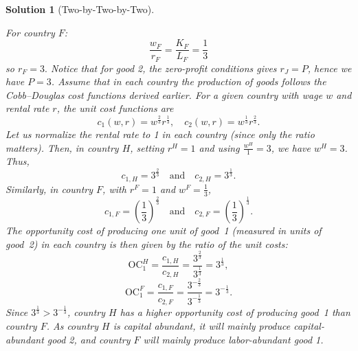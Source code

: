 \documentclass[a4paper,12pt]{article} %
\theoremstyle{nonitalic}
\newtheorem{solution}{Solution}
\begin{document}
\begin{solution}[Two-by-Two-by-Two]
\begin{enumerate}
            For country $F$:
            \[\frac{w_F}{r_F} = \frac{K_F}{L_F} = \frac{1}{3}\]
            so $r_F = 3.$
            Notice that for good 2, the zero-profit conditions gives $r_J = P$, hence we have $P=3$.
            Assume that in each country the production of goods follows the Cobb--Douglas cost functions derived earlier. For a given country with wage $w$ and rental rate $r$, the unit cost functions are
            \[
            c_1(w,r)= w^{\frac{2}{3}}r^{\frac{1}{3}},\quad c_2(w,r)= w^{\frac{1}{3}}r^{\frac{2}{3}}.
            \]
            Let us normalize the rental rate to 1 in each country (since only the ratio matters). Then, in country $H$, setting $r^H=1$ and using $\frac{w^H}{1}=3$, we have $w^H=3$. Thus,
            \[
            c_{1,H}= 3^{\frac{2}{3}} \quad \text{and} \quad c_{2,H}= 3^{\frac{1}{3}}.
            \]
            Similarly, in country $F$, with $r^F=1$ and $w^F=\frac{1}{3}$,
            \[
            c_{1,F}= \left(\frac{1}{3}\right)^{\frac{2}{3}} \quad \text{and} \quad c_{2,F}= \left(\frac{1}{3}\right)^{\frac{1}{3}}.
            \]
            The opportunity cost of producing one unit of good~1 (measured in units of good~2) in each country is then given by the ratio of the unit costs:
            \[
            \text{OC}_1^H = \frac{c_{1,H}}{c_{2,H}} = \frac{3^{\frac{2}{3}}}{3^{\frac{1}{3}}} = 3^{\frac{1}{3}},
            \]
            \[
            \text{OC}_1^F = \frac{c_{1,F}}{c_{2,F}} = \frac{3^{-\frac{2}{3}}}{3^{-\frac{1}{3}}} = 3^{-\frac{1}{3}}.
            \]
            Since $3^{\frac{1}{3}} > 3^{-\frac{1}{3}}$, country $H$ has a higher opportunity cost of producing good~1 than country $F$. 
            As country $H$ is capital abundant, it will mainly produce capital-abundant good 2, and country $F$ will mainly produce labor-abundant good 1.


\end{enumerate}
\end{solution}
\end{document}

